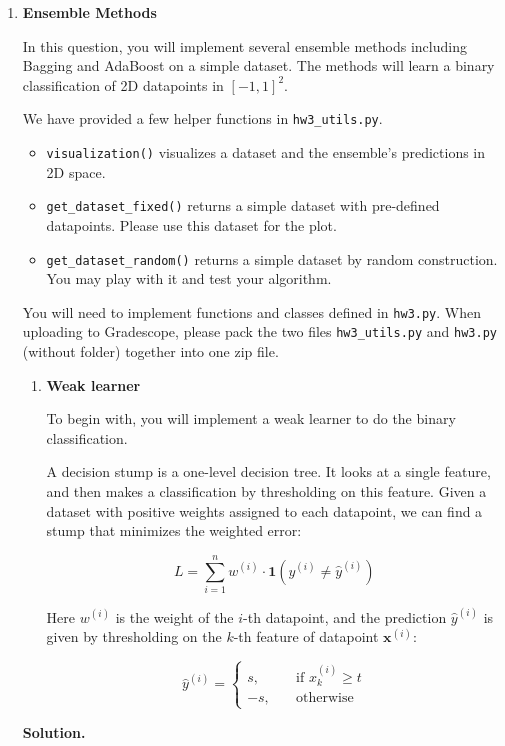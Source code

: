 \documentclass{article}
\newenvironment{Q}
        {%
          \clearpage
          \item
        }
        {%
          \phantom{s} %
          \bigskip
          \textbf{Solution.}
        }
\begin{document}
\begin{enumerate}[font={\Large\bfseries},left=0pt]

\begin{Q}
\textbf{\Large Ensemble Methods}

In this question, you will implement several ensemble methods including Bagging and AdaBoost on a simple dataset. The methods will learn a binary classification of 2D datapoints in $[-1, 1]^2$.

We have provided a few helper functions in \texttt{hw3\_utils.py}.
\begin{itemize}
    \item \texttt{visualization()} visualizes a dataset and the ensemble's predictions in 2D space.
    \item \texttt{get\_dataset\_fixed()} returns a simple dataset with pre-defined datapoints. Please use this dataset for the plot.
    \item \texttt{get\_dataset\_random()} returns a simple dataset by random construction. You may play with it and test your algorithm.
\end{itemize}

You will need to implement functions and classes defined in \texttt{hw3.py}. When uploading to Gradescope, please pack the two files \texttt{hw3\_utils.py} and \texttt{hw3.py} (without folder) together into one zip file.

\begin{enumerate}
    \item \textbf{Weak learner}
    
    To begin with, you will implement a weak learner to do the binary classification.
    
    A decision stump is a one-level decision tree. It looks at a single feature, and then makes a classification by thresholding on this feature. Given a dataset with positive weights assigned to each datapoint, we can find a stump that minimizes the weighted error:
    
    $$
        L = \sum_{i=1}^nw^{(i)}\cdot \bm{1}(y^{(i)} \ne \hat y^{(i)})
    $$
    
    Here $w^{(i)}$ is the weight of the $i$-th datapoint, and the prediction $\hat y^{(i)}$ is given by thresholding on the $k$-th feature of datapoint $\bm{x}^{(i)}$:
    
    $$
        \hat y^{(i)} = 
        \begin{cases}
            s,\quad & \text{if }x^{(i)}_k \ge t \\
            -s,\quad & \text{otherwise}
        \end{cases}
    $$
    

\end{enumerate}
\end{Q}
\end{enumerate}
\end{document}
